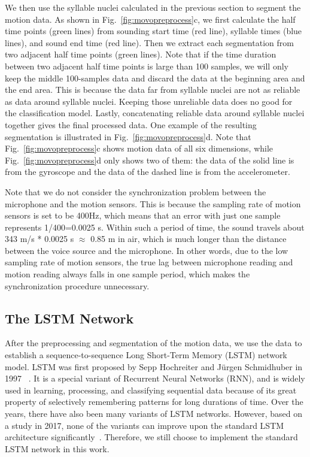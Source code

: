 We then use the syllable nuclei calculated in the previous section to segment the motion data. As shown in Fig.~\ref{fig:movopreprocess}c, we first calculate the half time points (green lines) from sounding start time (red line), syllable times (blue lines), and sound end time (red line). Then we extract each segmentation from two adjacent half time points (green lines). Note that if the time duration between two adjacent half time points is large than 100 samples, we will only keep the middle 100-samples data and discard the data at the beginning area and the end area. This is because the data far from syllable nuclei are not as reliable as data around syllable nuclei. Keeping those unreliable data does no good for the classification model.
%
Lastly, concatenating reliable data around syllable nuclei together gives the final processed data. One example of the resulting segmentation is illustrated in Fig.~\ref{fig:movopreprocess}d. Note that Fig.~\ref{fig:movopreprocess}c shows motion data of all six dimensions, while Fig.~\ref{fig:movopreprocess}d only shows two of them: the data of the solid line is from the gyroscope and the data of the dashed line is from the accelerometer.

Note that we do not consider the synchronization problem between the microphone and the motion sensors. This is because the sampling rate of motion sensors is set to be 400Hz, which means that an error with just one sample represents 1/400=0.0025 s. Within such a period of time, the sound travels about 343 m/s * 0.0025 s $\approx$ 0.85 m in air, which is much longer than the distance between the voice source and the microphone. In other words, due to the low sampling rate of motion sensors, the true lag between microphone reading and motion reading always falls in one sample period, which makes the synchronization procedure unnecessary. 



%
\subsection{The LSTM Network}
After the preprocessing and segmentation of the motion data, we use the data to establish a sequence-to-sequence Long Short-Term Memory (LSTM) network model. LSTM was first proposed by Sepp Hochreiter and J{\"u}rgen Schmidhuber in 1997 ~\cite{hochreiter1997long}. It is a special variant of Recurrent Neural Networks (RNN), and is widely used in learning, processing, and classifying sequential data because of 
its great property of selectively remembering patterns for long durations of time. Over the years, there have also been many variants of LSTM networks. However, based on a study in 2017, none of the variants can improve upon the standard LSTM architecture significantly~\cite{greff2017lstm}. Therefore, we still choose to implement the standard LSTM network in this work.



